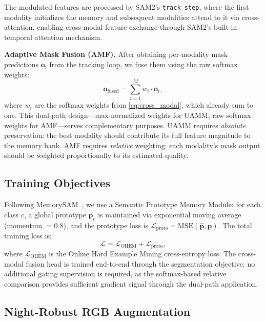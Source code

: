 The modulated features are processed by SAM2's \texttt{track\_step}, where the first modality initializes the memory and subsequent modalities attend to it via cross-attention, enabling cross-modal feature exchange through SAM2's built-in temporal attention mechanism.

\noindent\textbf{Adaptive Mask Fusion (AMF).}
After obtaining per-modality mask predictions $\mathbf{o}_i$ from the tracking loop, we fuse them using the raw softmax weights:
\begin{equation}
  \mathbf{o}_\text{fused} = \sum_{i=1}^{M} w_i \cdot \mathbf{o}_i,
  \label{eq:amf}
\end{equation}
where $w_i$ are the softmax weights from \cref{eq:cross_modal}, which already sum to one.
This dual-path design---max-normalized weights for UAMM, raw softmax weights for AMF---serves complementary purposes.
UAMM requires \textit{absolute} preservation: the best modality should contribute its full feature magnitude to the memory bank.
AMF requires \textit{relative} weighting: each modality's mask output should be weighted proportionally to its estimated quality.


\subsection{Training Objectives}
\label{sec:training}

Following MemorySAM~\cite{chen2025memorysam}, we use a Semantic Prototype Memory Module: for each class $c$, a global prototype $\mathbf{p}_c$ is maintained via exponential moving average (momentum $= 0.8$), and the prototype loss is $\mathcal{L}_\text{proto} = \text{MSE}(\hat{\mathbf{p}}, \mathbf{p})$.
The total training loss is:
\begin{equation}
  \mathcal{L} = \mathcal{L}_\text{OHEM} + \mathcal{L}_\text{proto},
  \label{eq:total_loss}
\end{equation}
where $\mathcal{L}_\text{OHEM}$ is the Online Hard Example Mining cross-entropy loss.
The cross-modal fusion head is trained end-to-end through the segmentation objective; no additional gating supervision is required, as the softmax-based relative comparison provides sufficient gradient signal through the dual-path application.


\subsection{Night-Robust RGB Augmentation}
\label{sec:night_aug}

